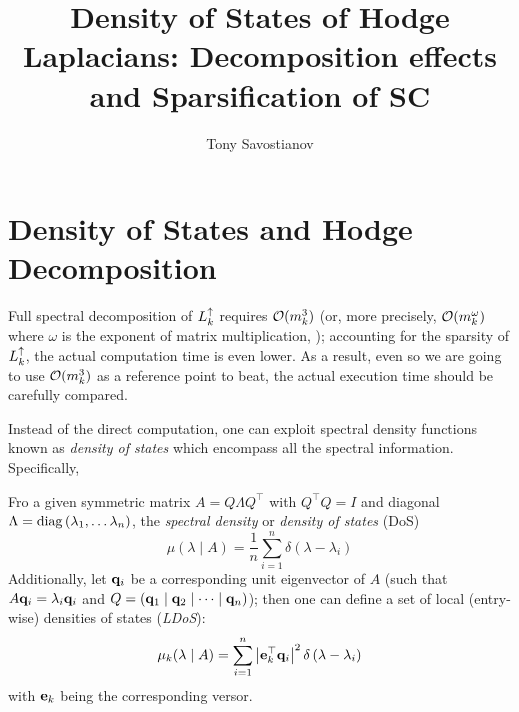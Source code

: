 \documentclass{mynotes}
\title{Density of States of Hodge Laplacians: Decomposition effects and Sparsification of SC}
\author[1]{ Tony Savostianov }
\affil[1]{ Computational Network Science, RWTH Aachen   \\ email: \email{a.s.savostyanov@gmail.com} }
\begin{document}
\maketitle





\chapter{ Density of States and Hodge Decomposition}


Full spectral decomposition of \( L_{k}^{\uparrow} \) requires \( \mathcal{O} ( m_k^3) \) (or, more precisely, \( \mathcal{O} (m_k^\omega)\) where \( \omega \) is the exponent of matrix multiplication, \cite{banks2023pseudospectral}); accounting for the sparsity of \( L_{k}^{\uparrow} \), the actual computation time is even lower. As a result, even so we are going to use \( \mathcal{O} (m_k^3 )\) as a reference point to beat, the actual execution time should be carefully compared. 

Instead of the direct computation, one can exploit spectral density functions known as \emph{density of states} which encompass all the spectral information. Specifically,

\begin{definition}
      Fro a given symmetric matrix \( A = Q \Lambda Q^\top \) with \( Q^\top Q = I \) and diagonal \( \Lambda = \operatorname{diag} \left( \lambda_1, \dots \lambda_{n} \right) \), the \emph{spectral density} or \emph{density of states} (DoS)
      \begin{equation}
            \mu( \lambda \mid A ) = \frac{1}{n} \sum_{i=1}^{n} \delta \left( \lambda - \lambda_i \right)
      \end{equation}
      Additionally, let \( \mathbf{q}_i \) be a corresponding unit eigenvector of \( A \) (such that \( A \mathbf{q}_i = \lambda_i \mathbf{q}_i \) and \( Q = \left( \mathbf{q}_1 \mid \mathbf{q}_2 \mid \dots \mid \mathbf{q}_n \right)\)); then one can define a set of local (entry-wise) densities of states (\emph{LDoS}):
      \begin{equation}
            \mu_k ( \lambda \mid A ) = \sum_{i=1}^{n} \left| \mathbf{e}_k^\top \mathbf{q}_i \right|^2 \delta \left( \lambda - \lambda_i \right)
      \end{equation}
      with \( \mathbf{e}_k \) being the corresponding versor. 
\end{definition}
\end{document}
